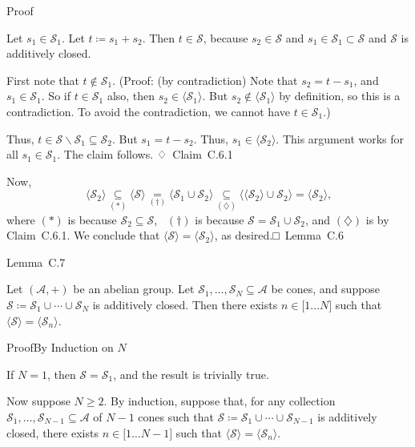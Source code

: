 \documentclass[
]{article}
\begin{document}
Proof

Let \(s_{1} \in \mathcal{S}_{1}\). Let \(t ≔ s_{1} + s_{2}\). Then
\(t \in \mathcal{S}\), because \(s_{2} \in \mathcal{S}\) and
\(s_{1} \in \mathcal{S}_{1} \subset \mathcal{S}\) and \(\mathcal{S}\) is
additively closed.

First note that \(t \notin \mathcal{S}_{1}\). (Proof: (by contradiction)
Note that \(s_{2} = t - s_{1}\), and \(s_{1} \in \mathcal{S}_{1}\). So
if \(t \in \mathcal{S}_{1}\) also, then
\(s_{2} \in {\langle\mathcal{S}_{1}\rangle}\). But
\(s_{2} \notin {\langle\mathcal{S}_{1}\rangle}\) by definition, so this
is a contradiction. To avoid the contradiction, we cannot have
\(t \in \mathcal{S}_{1}\).)

Thus,
\(t \in \mathcal{S} \smallsetminus \mathcal{S}_{1} \subseteq \mathcal{S}_{2}\).
But \(s_{1} = t - s_{2}\). Thus,
\(s_{1} \in {\langle\mathcal{S}_{2}\rangle}\). This argument works for
all \(s_{1} \in \mathcal{S}_{1}\). The claim follows. ♢~Claim~C.6.1

Now,
\[{\langle\mathcal{S}_{2}\rangle}\underset{( \ast )}{\subseteq}{\langle\mathcal{S}\rangle}\underset{( \dagger )}{=}{\langle\mathcal{S}_{1} \cup \mathcal{S}_{2}\rangle}\underset{(\diamondsuit)}{\subseteq}{\langle{\langle\mathcal{S}_{2}\rangle} \cup \mathcal{S}_{2}\rangle} = {\langle\mathcal{S}_{2}\rangle}\text{,}\]
where \(( \ast )\) is because \(\mathcal{S}_{2} \subseteq \mathcal{S}\),
~\(( \dagger )\) is because
\(\mathcal{S} = \mathcal{S}_{1} \cup \mathcal{S}_{2}\), and
\((\diamondsuit)\) is by Claim~C.6.1. We conclude that
\({\langle\mathcal{S}\rangle} = {\langle\mathcal{S}_{2}\rangle}\), as
desired.□~Lemma~C.6

Lemma~C.7

Let \(\left( \mathcal{A}, + \right)\) be an abelian group. Let
\(\mathcal{S}_{1},\ldots,\mathcal{S}_{N} \subseteq \mathcal{A}\) be
cones, and suppose
\(\mathcal{S} ≔ \mathcal{S}_{1} \cup \cdots \cup \mathcal{S}_{N}\) is
additively closed. Then there exists \(n \in \lbrack 1\ldots N\rbrack\)
such that
\({\langle\mathcal{S}\rangle} = {\langle\mathcal{S}_{n}\rangle}\).

ProofBy Induction on \(N\)

If \(N = 1\), then \(\mathcal{S} = \mathcal{S}_{1}\), and the result is
trivially true.

Now suppose \(N \geq 2\). By induction, suppose that, for any collection
\(\mathcal{S}_{1},\ldots,\mathcal{S}_{N - 1} \subseteq \mathcal{A}\) of
\(N - 1\) cones such that
\(\mathcal{S} ≔ \mathcal{S}_{1} \cup \cdots \cup \mathcal{S}_{N - 1}\)
is additively closed, there exists
\(n \in \lbrack 1\ldots N - 1\rbrack\) such that
\({\langle\mathcal{S}\rangle} = {\langle\mathcal{S}_{n}\rangle}\).
\end{document}
